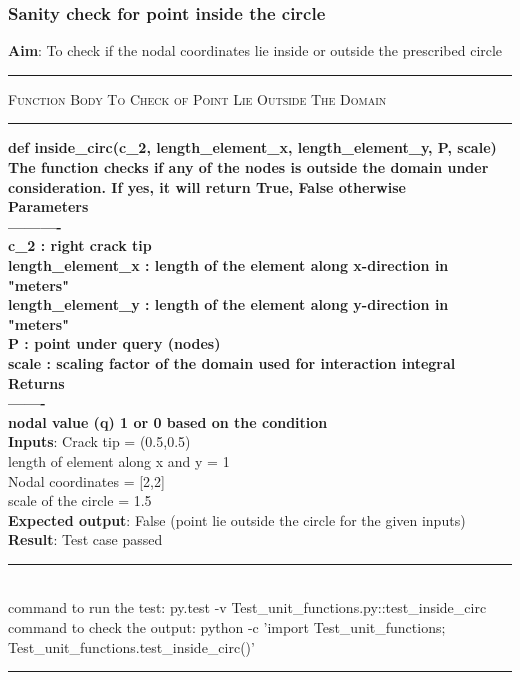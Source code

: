 \documentclass[fleqn, 12.5pt,a4paper]{report}
\begin{document}
\subsubsection{Sanity check for point inside the circle}
\textbf{Aim}: To check if the nodal coordinates lie inside or outside the prescribed circle\newline
{ \rule{\linewidth}{0.05cm}}
	{\scshape Function Body To Check of Point Lie Outside The Domain}\\
{ \rule{\linewidth}{0.05cm}}
{\selectfont
\textbf{def inside{\_}circ(c{\_}2, length{\_}element{\_}x, length{\_}element{\_}y, P, scale)\\
    The function checks if any of the nodes is outside the domain under consideration. If yes, it will return True, False otherwise\\
    Parameters\\
    ----------\\
    c{\_}2 : right crack tip\\
    length{\_}element{\_}x : length of the element along x-direction in "meters"\\
    length{\_}element{\_}y : length of the element along y-direction in "meters"\\
    P : point under query (nodes)\\
    scale : scaling factor of the domain used for interaction integral\\
    Returns\\
    -------\\
    nodal value (q) 1 or 0 based on the condition\\
    }}
\textbf{Inputs}: Crack tip = (0.5,0.5)\\ 
length of element along x and y = 1\\
Nodal coordinates = [2,2]\\
scale of the circle = 1.5\\
\textbf{Expected output}: False (point lie outside the circle for the given inputs)\\
\textbf{Result}: Test case passed
\\
{\rule{\linewidth}{0.02cm}}\\
command to run the test: {\selectfont py.test -v Test{\_}unit{\_}functions.py::test{\_}inside{\_}circ}\\
command to check the output: {\selectfont python -c 'import Test{\_}unit{\_}functions;\\
Test{\_}unit{\_}functions.test{\_}inside{\_}circ()'}\\
{\rule{\linewidth}{0.02cm}}
\end{document}
